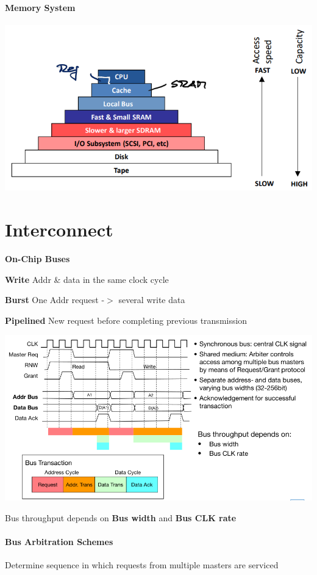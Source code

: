 \documentclass[english]{latex4ei/latex4ei_sheet}
\begin{document}
\paragraph{Memory System}
\begin{center}
  \centering
  \includegraphics[width=0.8\linewidth]{assets/MemorySystem.png}
  \label{fig:memorysystem}
\end{center}

\section{Interconnect}

\textbf{On-Chip Buses}

\textbf{Write} Addr \& data in the same clock cycle

\textbf{Burst} One Addr request -$>$ several write data

\textbf{Pipelined} New request before completing previous transmission

\begin{center}
	\includegraphics[width=\linewidth]{images//6.Interconnects/OnChipBasicOperation.png}
\end{center}
Bus throughput depends on \textbf{Bus width} and \textbf{Bus CLK rate}

\paragraph{Bus Arbitration Schemes} Determine sequence in which requests from multiple masters are serviced
\end{document}
